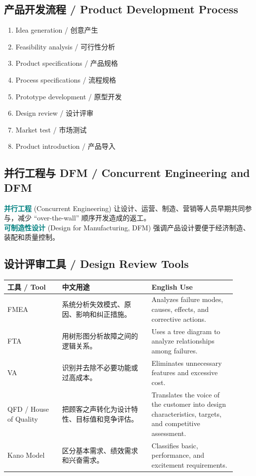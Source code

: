 \documentclass[11pt,a4paper]{ctexart}
\newcommand{\term}[2]{\textbf{\textcolor{Teal}{#1}} \textcolor{Muted}{(#2)}}
\begin{document}
\subsection{产品开发流程 / Product Development Process}
\begin{enumerate}
  \item Idea generation / 创意产生
  \item Feasibility analysis / 可行性分析
  \item Product specifications / 产品规格
  \item Process specifications / 流程规格
  \item Prototype development / 原型开发
  \item Design review / 设计评审
  \item Market test / 市场测试
  \item Product introduction / 产品导入
\end{enumerate}

\subsection{并行工程与 DFM / Concurrent Engineering and DFM}
\term{并行工程}{Concurrent Engineering} 让设计、运营、制造、营销等人员早期共同参与，减少 ``over-the-wall'' 顺序开发造成的返工。\\
\term{可制造性设计}{Design for Manufacturing, DFM} 强调产品设计要便于经济制造、装配和质量控制。

\subsection{设计评审工具 / Design Review Tools}
\begin{longtable}{L{0.22\linewidth}L{0.36\linewidth}L{0.34\linewidth}}
\toprule
\textbf{工具 / Tool} & \textbf{中文用途} & \textbf{English Use} \\
\midrule
FMEA & 系统分析失效模式、原因、影响和纠正措施。 & Analyzes failure modes, causes, effects, and corrective actions. \\
FTA & 用树形图分析故障之间的逻辑关系。 & Uses a tree diagram to analyze relationships among failures. \\
VA & 识别并去除不必要功能或过高成本。 & Eliminates unnecessary features and excessive cost. \\
QFD / House of Quality & 把顾客之声转化为设计特性、目标值和竞争评估。 & Translates the voice of the customer into design characteristics, targets, and competitive assessment. \\
Kano Model & 区分基本需求、绩效需求和兴奋需求。 & Classifies basic, performance, and excitement requirements. \\
\bottomrule
\end{longtable}
\end{document}
